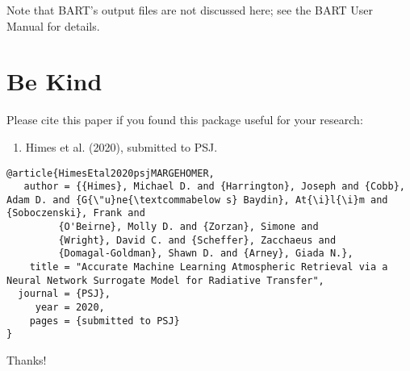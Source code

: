 \documentclass[letterpaper, 12pt]{article}
\begin{document}
\noindent Note that BART's output files are not discussed here; see the BART 
User Manual for details.



\section{Be Kind}
\label{sec:bekind}
Please cite this paper if you found this package useful for your
research:

\begin{enumerate}
\item Himes et al. (2020), submitted to PSJ.
\end{enumerate}

\begin{verbatim}
@article{HimesEtal2020psjMARGEHOMER,
   author = {{Himes}, Michael D. and {Harrington}, Joseph and {Cobb}, Adam D. and {G{\"u}ne{\textcommabelow s} Baydin}, At{\i}l{\i}m and {Soboczenski}, Frank and
         {O'Beirne}, Molly D. and {Zorzan}, Simone and
         {Wright}, David C. and {Scheffer}, Zacchaeus and
         {Domagal-Goldman}, Shawn D. and {Arney}, Giada N.},
    title = "Accurate Machine Learning Atmospheric Retrieval via a Neural Network Surrogate Model for Radiative Transfer",
  journal = {PSJ},
     year = 2020,
    pages = {submitted to PSJ}
}
\end{verbatim}

\noindent Thanks!


\end{document}
